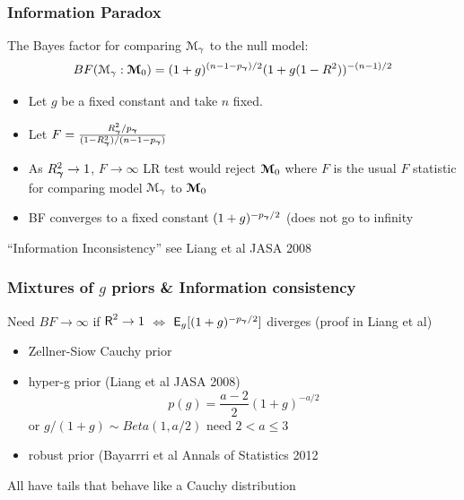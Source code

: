 \documentclass[]{beamer}
\begin{document}
\begin{frame}
  \frametitle{Information Paradox}
  
The Bayes factor for comparing ${\cal M}_\gamma$ to the null
model:
$$
 BF({\cal M}_\gamma : \boldsymbol{{\cal M}}_0) =    (1 + g)^{(n - 1 - p_{\boldsymbol{\gamma}})/2} (1 + g(1 - R^2))^{-(n-1)/2}
$$
\pause
\begin{itemize}
\item Let $g$ be a fixed constant and take $n$ fixed. \pause
\item Let $F = \frac{R_{\boldsymbol{\gamma}}^2/p_{\boldsymbol{\gamma}}}{(1 - R_{\boldsymbol{\gamma}}^2)/(n - 1 - p_{\boldsymbol{\gamma}})}$ \pause
\item As $R^2_{\boldsymbol{\gamma}} \to 1$, $F \to \infty$ LR test would reject $\boldsymbol{{\cal M}}_0$
  where $F$ is the usual $F$ statistic for  comparing model ${\cal M}_\gamma$ to
  $\boldsymbol{{\cal M}}_0$ \pause 
\item BF converges to a fixed constant $(1+g)^{-p_{\boldsymbol{\gamma}}/2}$  (does not go
  to infinity
\end{itemize}

``Information Inconsistency''  see Liang et al JASA 2008


\end{frame}
\begin{frame}
  \frametitle{Mixtures of $g$ priors \& Information consistency}
  
Need $BF \to \infty$ if $\textsf{R}^2 \to 1$  $\Leftrightarrow$ $\textsf{E}_g[(1 +
g)^{-p_{\boldsymbol{\gamma}}/2}]$ diverges  (proof in Liang et al)
\pause
\begin{itemize}
\item Zellner-Siow Cauchy prior \pause
\item hyper-g prior (Liang et al JASA 2008) 
$$p(g) = \frac{a-2}{2}(1 + g)^{-a/2}$$ or $g/(1+g) \sim Beta(1, a/2)$ 
need $2 < a \le 3$
\pause
\item robust prior (Bayarrri et al Annals of Statistics 2012 \pause
\end{itemize}

 All have tails that behave like a Cauchy distribution
\end{frame}
\end{document}
